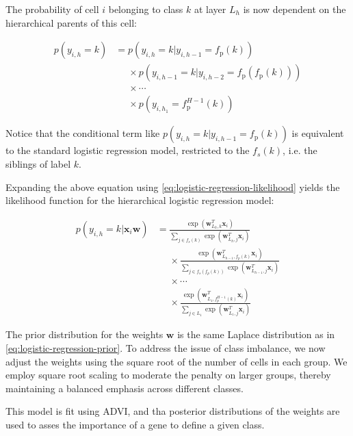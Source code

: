 The probability of cell $i$ belonging to class $k$ at layer $L_h$ is now dependent on the hierarchical parents of this cell:

\begin{equation}
    \begin{aligned}
    p(y_{i,h} = k) &= p(y_{i,h} = k | y_{i,h-1} = f_{\text{p}}(k)) \\
    &\phantom{=} \times p(y_{i,h-1} = k | y_{i,h-2} = f_{\text{p}}(f_{\text{p}}(k))) \\
    &\phantom{=} \times \cdots \\
    &\phantom{=} \times p(y_{i,h_1} = f_{\text{p}}^{H-1}(k))
    \end{aligned}
\end{equation}

Notice that the conditional term like $p(y_{i,h} = k | y_{i,h-1} = f_{\text{p}}(k))$ is equivalent to the standard logistic regression model, restricted to the $f_s(k)$, i.e. the siblings of label $k$. 

Expanding the above equation using \cref{eq:logistic-regression-likelihood} yields the likelihood function for the hierarchical logistic regression model:

\begin{equation}
    \begin{aligned}
    p(y_{i,h} = k | \mathbf{x}_{i} \mathbf{w}) &= 
         \frac{\exp(\mathbf{w}_{L_h, k}^T \mathbf{x}_i)}{\sum_{j \in f_s(k)} \exp(\mathbf{w}_{L_h, j}^T \mathbf{x}_i)} \\
        &\phantom{=} \times \frac{\exp(\mathbf{w}_{L_{h-1}, f_p(k)}^T \mathbf{x}_i)}{\sum_{j \in  f_s(f_p(k))} \exp(\mathbf{w}_{L_{h-1}, j}^T \mathbf{x}_i)} \\
        &\phantom{=} \times \cdots \\
        &\phantom{=} \times \frac{\exp(\mathbf{w}_{L_1, f_p^{H-1}(k)}^T \mathbf{x}_i)}{\sum_{j \in L_1} \exp(\mathbf{w}_{L_1, j}^T \mathbf{x}_i)}
    \end{aligned}
\end{equation}

The prior distribution for the weights $\mathbf{w}$ is the same Laplace distribution as in \cref{eq:logistic-regression-prior}. To address the issue of class imbalance, we now adjust the weights using the square root of the number of cells in each group. We employ square root scaling to moderate the penalty on larger groups, thereby maintaining a balanced emphasis across different classes.

This model is fit using \ac{ADVI}, and tha posterior distributions of the weights are used to asses the importance of a gene to define a given class. 

